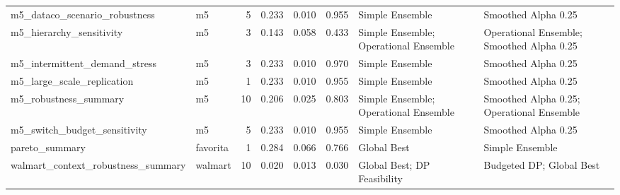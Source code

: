 \begin{table}
{\begin{tabular}{llrlllll}
               m5\_dataco\_scenario\_robustness &           m5 &                       5 &                                      0.233 &                                       0.010 &                  0.955 &                        Simple Ensemble &                        Smoothed Alpha 0.25 \\
                    m5\_hierarchy\_sensitivity &           m5 &                       3 &                                      0.143 &                                       0.058 &                  0.433 &  Simple Ensemble; Operational Ensemble &  Operational Ensemble; Smoothed Alpha 0.25 \\
               m5\_intermittent\_demand\_stress &           m5 &                       3 &                                      0.233 &                                       0.010 &                  0.970 &                        Simple Ensemble &                        Smoothed Alpha 0.25 \\
                  m5\_large\_scale\_replication &           m5 &                       1 &                                      0.233 &                                       0.010 &                  0.955 &                        Simple Ensemble &                        Smoothed Alpha 0.25 \\
                       m5\_robustness\_summary &           m5 &                      10 &                                      0.206 &                                       0.025 &                  0.803 &  Simple Ensemble; Operational Ensemble &  Smoothed Alpha 0.25; Operational Ensemble \\
                m5\_switch\_budget\_sensitivity &           m5 &                       5 &                                      0.233 &                                       0.010 &                  0.955 &                        Simple Ensemble &                        Smoothed Alpha 0.25 \\
                              pareto\_summary &     favorita &                       1 &                                      0.284 &                                       0.066 &                  0.766 &                            Global Best &                            Simple Ensemble \\
          walmart\_context\_robustness\_summary &      walmart &                      10 &                                      0.020 &                                       0.013 &                  0.030 &            Global Best; DP Feasibility &                   Budgeted DP; Global Best \\

\end{tabular}}
\end{table}
